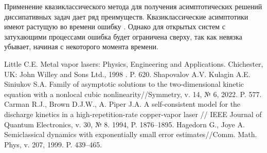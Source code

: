 Применение квазиклассического метода для получения асимптотических решений диссипативных задач дает ряд преимуществ. Квазиклассические асимптотики имеют растущую во времени ошибку \cite{HagJo}. Однако для открытых систем с затухающими процессами ошибка будет ограничена сверху, так как невязка убывает, начиная с некоторого момента времени.

%



\begin{thebibliography}{9} %
 Little C.E. Metal vapor lasers: Physics, Engineering and Applications.  Chichester, UK: John Willey and Sons Ltd., 1998 . P. 620.
 Shapovalov A.V. Kulagin A.E. Siniukov S.A. Family of asymptotic solutions to the two-dimensional kinetic equation with a nonlocal cubic nonlinearity//Symmetry, v. 14, № 6, 2022. P. 577.
 Carman R.J., Brown D.J.W., A. Piper J.A. A self-consistent model for the discharge kinetics in a high-repetition-rate copper-vapor laser // IEEE Journal of Quantum Electronics, v. 30, № 8. 1994, P. 1876--1895.
 Hagedorn G., Joye A. Semiclassical dynamics with exponentially small error estimates//Comm. Math.  Phys, v. 207, 1999. P. 439--465.
\end{thebibliography}





%
